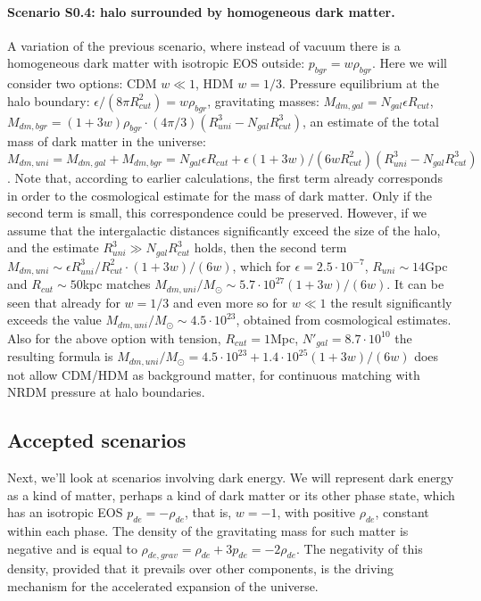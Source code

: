 \documentclass{article}
\begin{document}
\paragraph {Scenario S0.4: halo surrounded by homogeneous dark matter.} A variation of the previous scenario, where instead of vacuum there is a homogeneous dark matter with isotropic EOS outside: $ p_ {bgr} = w \rho_ {bgr} $. Here we will consider two options: CDM $ w \ll1 $, HDM $ w = 1/3 $. Pressure equilibrium at the halo boundary: $ \epsilon / (8 \pi R_ {cut} ^ 2) = w \rho_ {bgr} $, gravitating masses: $ M_ {dm, gal} = N_ {gal} \epsilon R_ {cut } $, $ M_ {dm, bgr} = (1 + 3w) \rho_ {bgr} \cdot (4 \pi / 3) (R_ {uni} ^ 3-N_ {gal} R_ {cut} ^ 3) $, an estimate of the total mass of dark matter in the universe: $ M_ {dm, uni} = M_ {dm, gal} + M_ {dm, bgr} = N_ {gal} \epsilon R_ {cut} + \epsilon (1 + 3w) / (6w R_ {cut} ^ 2) (R_ {uni} ^ 3-N_ {gal} R_ {cut} ^ 3) $. Note that, according to earlier calculations, the first term already corresponds in order to the cosmological estimate for the mass of dark matter. Only if the second term is small, this correspondence could be preserved. However, if we assume that the intergalactic distances significantly exceed the size of the halo, and the estimate $ R_ {uni} ^ 3 \gg N_ {gal} R_ {cut} ^ 3 $ holds, then the second term $ M_ {dm, uni} \sim \epsilon R_ {uni} ^ 3 / R_ {cut} ^ 2 \cdot (1 + 3w) / (6w) $, which for $ \epsilon = 2.5 \cdot10 ^ {- 7} $, $ R_ {uni} \sim14 $Gpc and $ R_ {cut} \sim50 $kpc matches $ M_ {dm, uni} /M_\odot\sim5.7\cdot10^ {27} (1 + 3w) / (6w) $. It can be seen that already for $ w = 1/3 $ and even more so for $ w \ll1 $ the result significantly exceeds the value $ M_ {dm, uni} /M_\odot\sim4.5\cdot10^ {23} $, obtained from cosmological estimates. Also for the above option with tension, $ R_ {cut} = 1 $Mpc, $ N '_ {gal} = 8.7 \cdot10 ^ {10} $ the resulting formula is $ M_ {dm, uni} /M_\odot=4.5 \cdot10 ^ {23} +1.4 \cdot10 ^ {25} (1 + 3w) / (6w) $ does not allow CDM/HDM as background matter, for continuous matching with NRDM pressure at halo boundaries. 

\subsection{Accepted scenarios}

Next, we'll look at scenarios involving dark energy. We will represent dark energy as a kind of matter, perhaps a kind of dark matter or its other phase state, which has an isotropic EOS $ p_ {de} = - \rho_ {de} $, that is, $ w = -1 $, with positive $ \rho_ {de} $, constant within each phase. The density of the gravitating mass for such matter is negative and is equal to $ \rho_ {de, grav} = \rho_ {de} + 3p_ {de} = - 2 \rho_ {de} $. The negativity of this density, provided that it prevails over other components, is the driving mechanism for the accelerated expansion of the universe.
\end{document}
